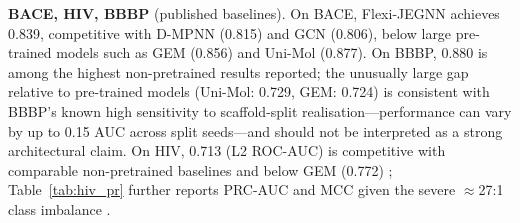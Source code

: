 \documentclass[pdflatex,sn-vancouver-num]{sn-jnl}%
\theoremstyle{thmstyleone}%
\theoremstyle{thmstyletwo}%
\theoremstyle{thmstylethree}%
\begin{document}
\textbf{BACE, HIV, BBBP} (published baselines).  On BACE, Flexi-JEGNN
achieves 0.839, competitive with D-MPNN (0.815) \cite{yang2019dmpnn} and
GCN (0.806), below large pre-trained models such as GEM (0.856) and Uni-Mol (0.877).
On BBBP, 0.880 is among the highest non-pretrained results reported;
the unusually large gap relative to pre-trained models
(Uni-Mol: 0.729, GEM: 0.724) is consistent with BBBP's known high
sensitivity to scaffold-split realisation---performance can vary by up to
0.15 AUC across split seeds---and should not be interpreted as a strong
architectural claim.
On HIV, 0.713 (L2 ROC-AUC) is competitive with comparable non-pretrained baselines
and below GEM (0.772) \cite{fang2022gem}; Table~\ref{tab:hiv_pr} further
reports PRC-AUC and MCC given the severe $\approx$27:1 class
imbalance \cite{chicco2020mcc}.
\end{document}

